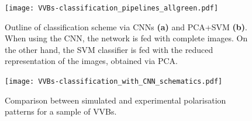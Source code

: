 



\begin{figure}[tb]
	\centering
	\texttt{[image: VVBs-classification\_pipelines\_allgreen.pdf]}
	\caption{
	Outline of classification scheme via CNNs \textbf{(a)} and PCA+SVM \textbf{(b)}.
	When using the CNN, the network is fed with complete images.
	On the other hand, the SVM classifier is fed with the reduced representation of the images, obtained via PCA.
	}
	\label{fig:VVBs:class_techniques}
\end{figure}

\begin{figure}[tb]
    \centering
    \texttt{[image: VVBs-classification\_with\_CNN\_schematics.pdf]}
    \caption{
    	Comparison between simulated and experimental polarisation patterns for a sample of \acp{VVB}.
    }%
    \label{fig:VVBs:simVsExp}
\end{figure}




